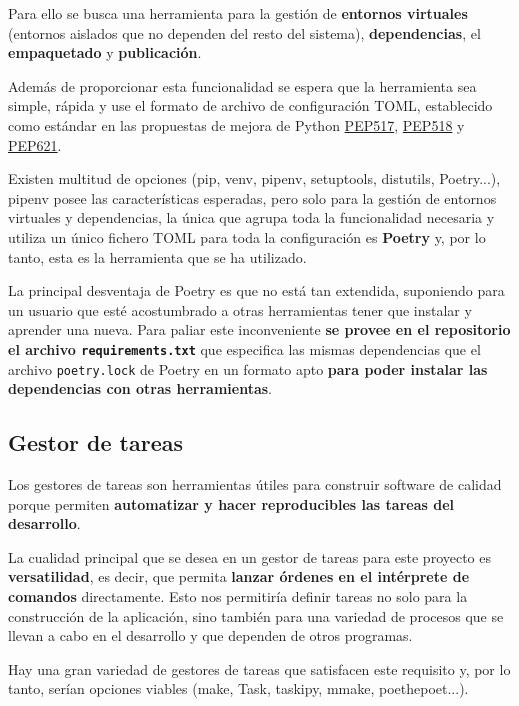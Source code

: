 Para ello se busca una herramienta para la gestión de \textbf{entornos virtuales} (entornos aislados que no dependen del resto del sistema), \textbf{dependencias}, el \textbf{empaquetado} y \textbf{publicación}.

Además de proporcionar esta funcionalidad se espera que la herramienta sea simple, rápida y use el formato de archivo de configuración TOML, establecido como estándar en las propuestas de mejora de Python \href{https://peps.python.org/pep-0517/}{PEP517}, \href{https://peps.python.org/pep-0518/}{PEP518} y \href{https://peps.python.org/pep-0621/}{PEP621}.

Existen multitud de opciones (pip, venv, pipenv, setuptools, distutils, Poetry...), pipenv posee las características esperadas, pero solo para la gestión de entornos virtuales y dependencias, la única que agrupa toda la funcionalidad necesaria y utiliza un único fichero TOML para toda la configuración es \textbf{Poetry} y, por lo tanto, esta es la herramienta que se ha utilizado.

La principal desventaja de Poetry es que no está tan extendida, suponiendo para un usuario que esté acostumbrado a otras herramientas tener que instalar y aprender una nueva. Para paliar este inconveniente \textbf{se provee en el repositorio el archivo \texttt{requirements.txt}} que especifica las mismas dependencias que el archivo \texttt{poetry.lock} de Poetry en un formato apto \textbf{para poder instalar las dependencias con otras herramientas}.


\subsection{Gestor de tareas}

Los gestores de tareas son herramientas útiles para construir software de calidad porque permiten \textbf{automatizar y hacer reproducibles las tareas del desarrollo}.  

La cualidad principal que se desea en un gestor de tareas para este proyecto es \textbf{versatilidad}, es decir, que permita \textbf{lanzar órdenes en el intérprete de comandos} directamente.  Esto nos permitiría definir tareas no solo para la construcción de la aplicación, sino también para una variedad de procesos que se llevan a cabo en el desarrollo y que dependen de otros programas.

Hay una gran variedad de gestores de tareas que satisfacen este requisito y, por lo tanto, serían opciones viables (make, Task, taskipy, mmake, poethepoet...).

